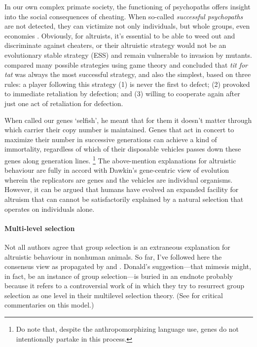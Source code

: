 \documentclass{article}
\begin{document}
In our own complex primate society, the functioning of psychopaths offers
insight into the social consequences of cheating. When so-called
\emph{successful psychopaths} are not detected, they can victimize not only
individuals, but whole groups, even economies \citep{babiak1995, boddy2006,
boddy2010, kirkman2005}. Obviously, for altruists, it's essential to be able to
weed out and discriminate against cheaters, or their altruistic strategy would
not be an evolutionary stable strategy (ESS) and remain vulnerable to invasion
by mutants. \citet*{axelrod1981} compared many possible strategies using game
theory and concluded that \emph{tit for tat} was always the most successful
strategy, and also the simplest, based on three rules: a player following this
strategy (1) is never the first to defect; (2) provoked to immediate
retaliation by defection; and (3) willing to cooperate again after just one act
of retaliation for defection.

When \citet{dawkins1976} called our genes ‘selfish’, he meant that for them it
doesn't matter through which carrier their copy number is maintained. Genes
that act in concert to maximize their number in successive generations can
achieve a kind of immortality, regardless of which of their disposable vehicles
passes down these genes along generation lines. \footnote{Do note that, despite the
anthropomorphizing language use, genes do not intentionally partake in this
process.} The above-mention explanations for altruistic behaviour are fully in
accord with Dawkin's gene-centric view of evolution wherein the replicators are
genes and the vehicles are individual organisms. However, it can be argued that
humans have evolved an expanded facility for altruism that can cannot be
satisfactorily explained by a natural selection that operates on individuals
alone.

\paragraph{Multi-level selection}

Not all authors agree that group selection is an extraneous explanation for
altruistic behaviour in nonhuman animals. So far, I've followed here the
consensus view as propagated by \citet{hamilton1964} and \citet{dawkins1976}.
Donald's suggestion---that mimesis might, in fact, be an instance of group
selection---is buried in an endnote \citep[p.~338]{donald2001} probably
because it refers to a controversial work of \citet{sober1999} in which they
try to resurrect group selection as one level in their multilevel selection
theory. (See \citealp{dennett2002} for critical commentaries on this model.)
\end{document}
